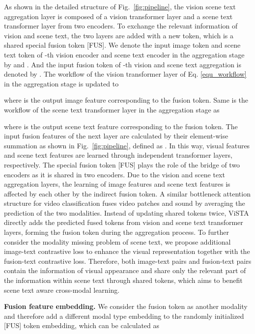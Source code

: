\documentclass[10pt,twocolumn,letterpaper]{article}
\begin{document}
As shown in the detailed structure of Fig.~\ref{fig:pipeline}, the vision scene text aggregation layer is composed of a vision transformer layer and a scene text transformer layer from two encoders. 
To exchange the relevant information of vision and scene text, the two layers are added with a new token, which is a shared special fusion token [FUS]. We denote the input image token and scene text token of -th vision encoder and scene text encoder in the aggregation stage by  and . And the input fusion token of -th vision and scene text aggregation is denoted by .
The workflow of the vision transformer layer of Eq. \ref{equ_workflow} in the aggregation stage is updated to

where  is the output image feature corresponding to the fusion token.
Same is the workflow of the scene text transformer layer in the aggregation stage as

where  is the output scene text feature corresponding to the fusion token.
The input fusion features of the next layer are calculated by their element-wise summation as shown in Fig.~\ref{fig:pipeline}, defined as . In this way, visual features  and scene text features  are learned through independent transformer layers, respectively. 
The special fusion token [FUS] plays the role of the bridge of two encoders as it is shared in two encoders. 
Due to the vision and scene text aggregation layers, the learning of image features and scene text features is affected by each other by the indirect fusion token. A similar bottleneck attention structure for video classification \cite{bottleneck} fuses video patches and sound by averaging the prediction of the two modalities. Instead of updating shared tokens twice, ViSTA directly adds the predicted fused tokens from vision and scene text transformer layers, forming the fusion token during the aggregation process. To further consider the modality missing problem of scene text, we propose additional image-text contrastive loss to enhance the visual representation together with the fusion-text contrastive loss.
Therefore, both image-text pairs and fusion-text pairs contain the information of visual appearance and share only the relevant part of the information within scene text through shared tokens, which aims to benefit scene text aware cross-modal learning.


\noindent \textbf{Fusion feature embedding.} 
We consider the fusion token as another modality and therefore add a different modal type embedding to the randomly initialized [FUS] token embedding, which can be calculated as
\end{document}
